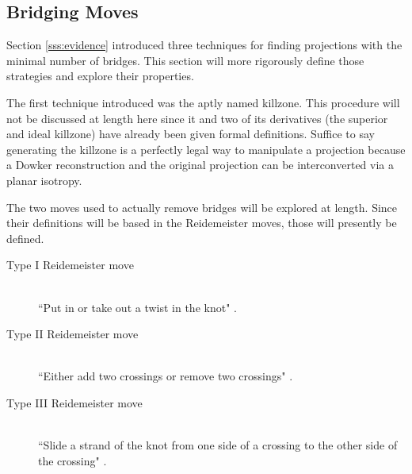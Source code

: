 \documentclass[titlepage,11pt]{article}
\newcommand{\dq}[4][]{``#2"#1 \cite[#4]{#3}.}
\begin{document}
\subsection{Bridging Moves}\label{sss:bridging}
Section \ref{sss:evidence} introduced three techniques for finding projections with the minimal number of bridges. This section will more rigorously define those strategies and explore their properties.\par
The first technique introduced was the aptly named killzone. This procedure will not be discussed at length here since it and two of its derivatives (the superior and ideal killzone) have already been given formal definitions. Suffice to say generating the killzone is a perfectly legal way to manipulate a projection because a Dowker reconstruction and the original projection can be interconverted via a planar isotropy.\par
The two moves used to actually remove bridges will be explored at length. Since their definitions will be based in the Reidemeister moves, those will presently be defined.\par

\begin{defi}
    \begin{description}
        \item[Type I Reidemeister move] \hfill \\ \dq{Put in or take out a twist in the knot}{bib:knotbook}{13}
        \item[Type II Reidemeister move] \hfill \\ \dq{Either add two crossings or remove two crossings}{bib:knotbook}{13}
        \item[Type III Reidemeister move] \hfill \\ \dq{Slide a strand of the knot from one side of a crossing to the other side of the crossing}{bib:knotbook}{13}
    \end{description}
\end{defi}
\end{document}
